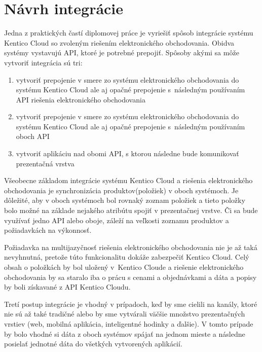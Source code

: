 \documentclass[
  printed, %
  table,   %
  lof,     %
  nolot,     %
  twoside,  
]{fithesis3}
\begin{document}
\section{Návrh integrácie}
Jedna z praktických častí diplomovej práce je vyriešiť spôsob integrácie systému Kentico Cloud so zvoleným riešením elektronického obchodovania. Obidva systémy vystavujú API, ktoré je potrebné prepojiť. Spôsoby akými sa môže vytvoriť integrácia sú tri: 
\begin{enumerate}
	\item vytvoriť prepojenie v smere zo systému elektronického obchodovania do systému Kentico Cloud ale aj opačné prepojenie s~následným používaním API riešenia elektronického obchodovania
	\item vytvoriť prepojenie v smere zo systému elektronického obchodovania do systému Kentico Cloud ale aj opačné prepojenie s~následným používaním oboch API
	\item vytvoriť aplikáciu nad obomi API, s ktorou následne bude komunikovať prezentačná vrstva
\end{enumerate}

Všeobecne základom integrácie systému Kentico Cloud a riešenia elektronického obchodovania je synchronizácia produktov(položiek) v oboch systémoch. Je dôležité, aby v oboch systémoch bol rovnaký zoznam položiek a tieto položky bolo možné na základe nejakého atribútu spojiť v prezentačnej vrstve. Či sa bude využívať jedno API alebo oboje, záleží na veľkosti zoznamu produktov a požiadavkách na výkonnosť.

Požiadavka na multijazyčnosť riešenia elektronického obchodovania nie je až taká nevyhnutná, pretože túto funkcionalitu dokáže zabezpečiť Kentico Cloud. Celý obsah o položkách by bol uložený v~Kentico Cloude a riešenie elektronického obchodovania by sa staralo iba o prácu s cenami a objednávkami a dáta a popisy by boli získavané z API Kentico Cloudu. 

Tretí postup integrácie je vhodný v prípadoch, keď by sme cielili na kanály, ktoré nie sú až také tradičné alebo by sme vytvárali väčšie množstvo prezentačných vrstiev (web, mobilná aplikácia, inteligentné hodinky a ďalšie). V tomto prípade by bolo vhodné si dáta z oboch systémov spájať na jednom mieste a následne posielať jednotné dáta do všetkých vytvorených aplikácií.
\end{document}
